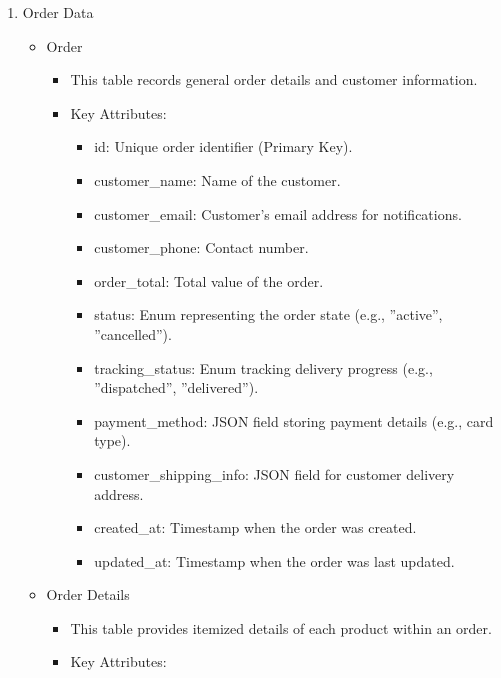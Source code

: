 \documentclass{llncs}
\begin{document}
\begin{enumerate}
    \item Order Data
          \begin{itemize}
              \item Order
                    \begin{itemize}
                        \item This table records general order details and customer information.
                        \item Key Attributes:
                              \begin{itemize}
                                  \item id: Unique order identifier (Primary Key).
                                  \item customer\_name: Name of the customer.
                                  \item customer\_email: Customer's email address for notifications.
                                  \item customer\_phone: Contact number.
                                  \item order\_total: Total value of the order.
                                  \item status: Enum representing the order state (e.g., ''active'', ''cancelled'').
                                  \item tracking\_status: Enum tracking delivery progress (e.g., ''dispatched'', ''delivered'').
                                  \item payment\_method: JSON field storing payment details (e.g., card type).
                                  \item customer\_shipping\_info: JSON field for customer delivery address.
                                  \item created\_at: Timestamp when the order was created.
                                  \item updated\_at: Timestamp when the order was last updated.
                              \end{itemize}
                    \end{itemize}
              \item Order Details
                    \begin{itemize}
                        \item This table provides itemized details of each product within an order.
                        \item Key Attributes:

\end{itemize}
\end{itemize}
\end{enumerate}
\end{document}

